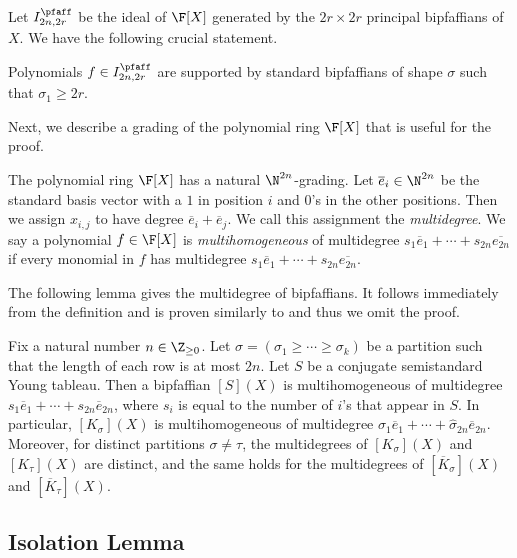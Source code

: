 \documentclass[letterpaper, 11pt]{amsart}
\begin{document}
Let $I^{\pfaff}_{2n, 2r}$ be the ideal of $\F[X]$ generated by the $2r \times 2r$ principal bipfaffians of $X$.
We have the following crucial statement.
\begin{prop}[{\cite[\S 5]{HT92}}]\label{prop:pfaff_shape}
    Polynomials $f \in I^{\pfaff}_{2n, 2r}$ are supported by standard bipfaffians of shape $\sigma$ such that $\sigma_1 \geq 2r$.
\end{prop}

Next, we describe a grading of the polynomial ring $\F[X]$ that is useful for the proof.

\begin{defn}\label{defn:multideg_pfaff}
    The polynomial ring $\F[X]$ has a natural $\N^{2n}$-grading.
    Let $\overline{e}_i \in \N^{2n}$ be the standard basis vector with a $1$ in position $i$ and $0$'s in the other positions.
    Then we assign $x_{i, j}$ to have degree $\overline{e}_i + \overline{e}_j$.
    We call this assignment the \emph{multidegree}.
    We say a polynomial $f \in \F[X]$ is \emph{multihomogeneous} of multidegree $s_1 \overline{e}_1 + \cdots + s_{2n} \overline{e_{2n}}$ if every monomial in $f$ has multidegree $s_1 \overline{e}_1 + \cdots + s_{2n} \overline{e_{2n}}$.
\end{defn} 

The following lemma gives the multidegree of bipfaffians.
It follows immediately from the definition and is proven similarly to  and thus we omit the proof.
\begin{lem}\label{lem:canonical_degs_bifpaffian}
    Fix a natural number $n \in \Z_{\geq 0}$.
    Let $\sigma = (\sigma_1 \geq \cdots \geq \sigma_k)$ be a partition such that the length of each row is at most $2n$.
    Let $S$ be a conjugate semistandard Young tableau.
    Then a bipfaffian $[S](X)$ is multihomogeneous of multidegree $s_1 \overline{e}_1 + \cdots + s_{2n} \overline{e}_{2n}$, where $s_i$ is equal to the number of $i$'s that appear in $S$.
    In particular, $[K_\sigma](X)$ is multihomogeneous of multidegree $\widehat{\sigma}_1 \overline{e}_1 + \cdots + \widehat{\sigma}_{2n} \overline{e}_{2n}$.
    Moreover, for distinct partitions $\sigma \neq \tau$, the multidegrees of $[K_\sigma](X)$ and $[K_\tau](X)$ are distinct, and the same holds for the multidegrees of $[\overline{K}_\sigma](X)$ and $[\overline{K}_\tau](X)$.
\end{lem}

\subsection{Isolation Lemma}
\end{document}
